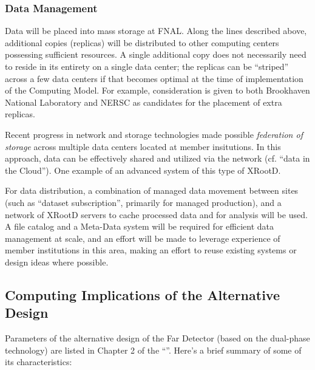 \subsubsection{Data Management}
\label{sec:detectors-sc-infrastructure-computing-model-data-mgt}

Data will be placed into mass storage at FNAL. Along the lines described above, additional copies (replicas) will be distributed to other
computing centers possessing sufficient resources.
A single additional copy does not necessarily need to reside in its entirety on a single data center; the replicas can be ``striped'' across a few data centers if that
becomes optimal at the time of implementation of the Computing Model. For example, consideration is given to both Brookhaven National Laboratory
and NERSC as candidates for the placement of extra replicas.

Recent progress in network and storage technologies made possible \textit{federation of storage} across multiple data centers located at
member insitutions. In this approach, data can be effectively shared and utilized via the network (cf. ``data in the Cloud''). One example of
an advanced system of this type of XRootD.

For data distribution, a combination of managed data movement between sites (such as ``dataset subscription'',
primarily for managed production), and a network of XRootD servers to cache processed data and for analysis will be used.
A file catalog and a Meta-Data system will be required for efficient data management at scale, and an effort will be made to leverage experience of
member institutions in this area, making an effort to reuse existing systems or design ideas where possible.

\subsection{Computing Implications of the Alternative Design}
\label{sec:detectors-sc-alternate}
Parameters of the alternative design of the Far Detector (based on the dual-phase technology)
are listed in Chapter 2 of the ``\anxrates''. Here's a brief summary of some of its characteristics:

